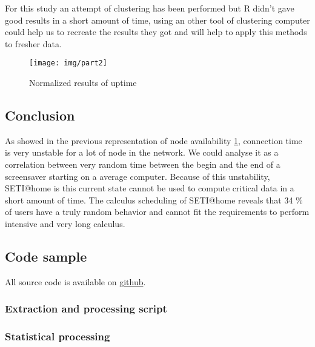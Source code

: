 For this study an attempt of clustering has been performed but R didn't gave good results in a short amount
of time, using an other tool of clustering computer could help us to recreate the results they got and will
help to apply this methods to fresher data.


\begin{figure}[h]
\begin{center}
\texttt{[image: img/part2]}
\end{center}
\caption{Normalized results of uptime}
\label{part2}
\end{figure}


\subsection{Conclusion}

As showed in the previous representation of node availability \ref{part2}, connection time
is very unstable for a lot of node in the network. We could analyse it as a correlation between
very random time between the begin and the end of a screensaver starting on a average computer.
Because of this unstability, SETI@home is this current state cannot be used to compute critical
data in a short amount of time. The calculus scheduling of SETI@home reveals that 34 \% of users
have a truly random behavior and cannot fit the requirements to perform intensive and very long
calculus.

\subsection{Code sample}

All source code is available on 
\href{https://github.com/sieben/upmc/tree/master/methodologie/homework2-gnuplot}{github}.

\subsubsection{Extraction and processing script}



\subsubsection{Statistical processing}




